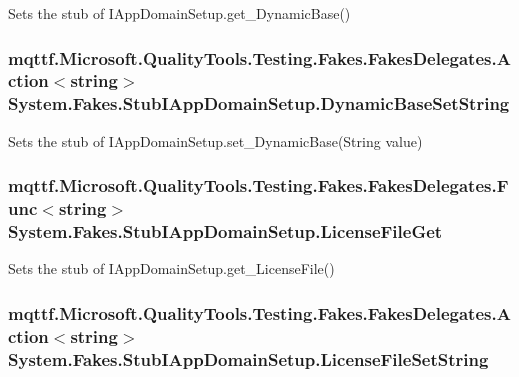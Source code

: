 Sets the stub of I\-App\-Domain\-Setup.\-get\-\_\-\-Dynamic\-Base()

\hypertarget{class_system_1_1_fakes_1_1_stub_i_app_domain_setup_a07cc0a44b5b04e6ffeeed3f80c2bdc84}{
\subsubsection[{Dynamic\-Base\-Set\-String}]{\setlength{\rightskip}{0pt plus 5cm}mqttf.\-Microsoft.\-Quality\-Tools.\-Testing.\-Fakes.\-Fakes\-Delegates.\-Action$<$string$>$ System.\-Fakes.\-Stub\-I\-App\-Domain\-Setup.\-Dynamic\-Base\-Set\-String}}\label{class_system_1_1_fakes_1_1_stub_i_app_domain_setup_a07cc0a44b5b04e6ffeeed3f80c2bdc84}


Sets the stub of I\-App\-Domain\-Setup.\-set\-\_\-\-Dynamic\-Base(\-String value)

\hypertarget{class_system_1_1_fakes_1_1_stub_i_app_domain_setup_a96f5abf9c4f12dfed01d8b61d42b3ffa}{
\subsubsection[{License\-File\-Get}]{\setlength{\rightskip}{0pt plus 5cm}mqttf.\-Microsoft.\-Quality\-Tools.\-Testing.\-Fakes.\-Fakes\-Delegates.\-Func$<$string$>$ System.\-Fakes.\-Stub\-I\-App\-Domain\-Setup.\-License\-File\-Get}}\label{class_system_1_1_fakes_1_1_stub_i_app_domain_setup_a96f5abf9c4f12dfed01d8b61d42b3ffa}


Sets the stub of I\-App\-Domain\-Setup.\-get\-\_\-\-License\-File()

\hypertarget{class_system_1_1_fakes_1_1_stub_i_app_domain_setup_ab4a4d30a65ccf9572bf2513506dc393c}{
\subsubsection[{License\-File\-Set\-String}]{\setlength{\rightskip}{0pt plus 5cm}mqttf.\-Microsoft.\-Quality\-Tools.\-Testing.\-Fakes.\-Fakes\-Delegates.\-Action$<$string$>$ System.\-Fakes.\-Stub\-I\-App\-Domain\-Setup.\-License\-File\-Set\-String}}\label{class_system_1_1_fakes_1_1_stub_i_app_domain_setup_ab4a4d30a65ccf9572bf2513506dc393c}


